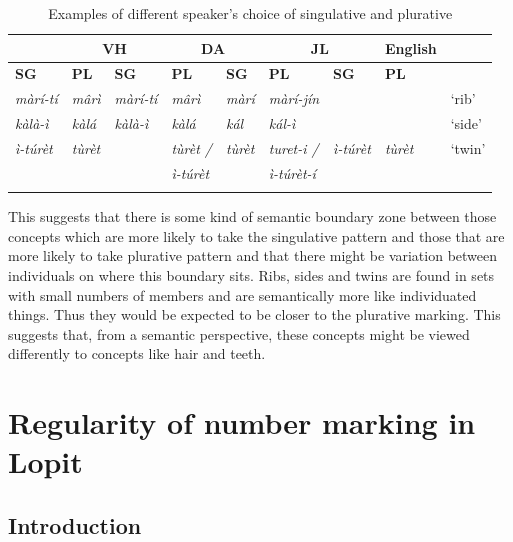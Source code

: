 \documentclass[output=paper]{langsci/langscibook}
\begin{document}
\begin{table}
\begin{tabularx}{\textwidth}{lllllllll}
\lsptoprule

\multicolumn{2}{c}{ \textbf{AL}} & \multicolumn{2}{c}{ \textbf{VH}} & \multicolumn{2}{c}{ \textbf{DA}} & \multicolumn{2}{c}{ \textbf{JL}} & \textbf{English}\\ \midrule
\textbf{SG} & \textbf{PL} & \textbf{SG} & \textbf{PL} & \textbf{SG} & \textbf{PL} & \textbf{SG} & 
 \textbf{PL} & \\ \midrule
\itshape m\`{a}r\'{i}-t\'{i} & \itshape m\^{a}r\`{i} & \itshape m\`{a}r\'{i}-t\'{i} & \itshape m\^{a}r\`{i} & \itshape m\`{a}r\'{i} & \itshape m\`{a}r\'{i}-j\'{i}n &  &  & ‘rib’\\
\itshape k\`{a}l\`{a}-\`{i} & \itshape k\`{a}l\'{a} & \itshape k\`{a}l\`{a}-\`{i} & \itshape k\`{a}l\'{a} & \itshape k\'{a}l & \itshape k\'{a}l-\`{i} &  &  & ‘side’\\
\itshape \`{i}-t\'{u}r\`{e}t & \itshape t\`{u}r\`{e}t &  & \itshape t\`{u}r\`{e}t / & {\itshape t\`{u}r\`{e}t } & {\itshape turet-i /}

& \itshape \`{i}-t\'{u}r\`{e}t & \itshape t\`{u}r\`{e}t & ‘twin’\\
&&& \itshape \`{i}-t\'{u}r\`{e}t && \itshape \`{i}-t\'{u}r\`{e}t-\'{i} & & \\
\lspbottomrule
\end{tabularx}
\caption{Examples of different speaker’s choice of singulative and plurative}
\label{tab:moodie:8}
\end{table}

This suggests that there is some kind of semantic boundary zone between those concepts which are more likely to take the singulative pattern and those that are more likely to take plurative pattern and that there might be variation between individuals on where this boundary sits. Ribs, sides and twins are found in sets with small numbers of members and are semantically more like individuated things. Thus they would be expected to be closer to the plurative marking. This suggests that, from a semantic perspective, these concepts might be viewed differently to concepts like hair and teeth.

\section{Regularity of number marking in Lopit}\label{sec:moodie:4}


\subsection{Introduction} \label{sec:moodie:4.1}
\end{document}
